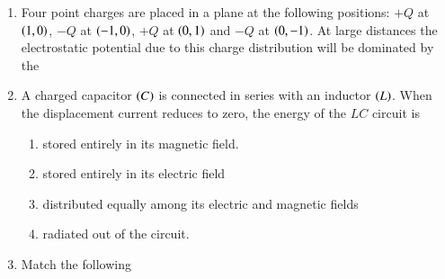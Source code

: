 \documentclass[journal]{IEEEtran}
\begin{document}
\begin{enumerate}
\begin{enumerate}
    \end{enumerate}
    \item Four point charges are placed in a plane at the following positions: $+Q$ at $\left(1,0\right)$, $-Q$ at $\left(-1,0\right)$, $+Q$ at $\left(0,1\right)$ and $-Q$ at $\left(0,-1\right)$. At large distances the electrostatic potential due to this charge distribution will be dominated by the 
    \begin{enumerate}
    \end{enumerate}
    \item A charged capacitor $\left(C\right)$ is connected in series with an inductor $\left(L\right)$. When the displacement current reduces to zero, the energy of the $LC$ circuit is
    \begin{enumerate}
            \item stored entirely in its magnetic field.
            \item stored entirely in its electric field
            \item distributed equally among its electric and magnetic fields
            \item radiated out of the circuit.
    \end{enumerate}
    \item Match the following 
    \begin{table}[!h]
        \centering
        
    \end{table} 
    

\end{enumerate}
\end{document}
